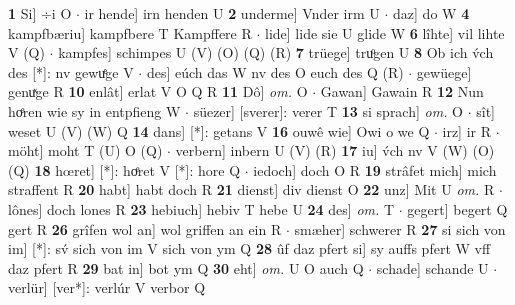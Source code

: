 \documentclass[8pt,a4paper,notitlepage]{article}
\begin{document}
\begin{table}[ht]
\begin{minipage}[t]{0.5\linewidth}
\textbf{1} Si] ÷i O  $\cdot$ ir hende] irn henden U \textbf{2} underme] Vnder irm U  $\cdot$ daz] do W \textbf{4} kampfbæriu] kampfbere T Kampffere R  $\cdot$ lide] lide sie U glide W \textbf{6} lîhte] vil lihte V (Q)  $\cdot$ kampfes] schimpes U (V) (O) (Q) (R) \textbf{7} trüege] truͦgen U \textbf{8} Ob ich v́ch des [*]: nv gewuͤge V  $\cdot$ des] eúch das W nv des O euch des Q (R)  $\cdot$ gewüege] genuͯge R \textbf{10} enlât] erlat V O Q R \textbf{11} Dô] \textit{om.} O  $\cdot$ Gawan] Gawain R \textbf{12} Nun hoͤren wie sy in entpfieng W  $\cdot$ süezer] [sverer]: verer T \textbf{13} si sprach] \textit{om.} O  $\cdot$ sît] weset U (V) (W) Q \textbf{14} dans] [*]: getans V \textbf{16} ouwê wie] Owi o we Q  $\cdot$ irz] ir R  $\cdot$ möht] moht T (U) O (Q)  $\cdot$ verbern] inbern U (V) (R) \textbf{17} iu] v́ch nv V (W) (O) (Q) \textbf{18} hœret] [*]: hoͤret V [*]: hore  Q  $\cdot$ iedoch] doch O R \textbf{19} strâfet mich] mich straffent R \textbf{20} habt] habt doch R \textbf{21} dienst] div dienst O \textbf{22} unz] Mit U \textit{om.} R  $\cdot$ lônes] doch lones R \textbf{23} hebiuch] hebiv T hebe U \textbf{24} des] \textit{om.} T  $\cdot$ gegert] begert Q gert R \textbf{26} grîfen wol an] wol griffen an ein R  $\cdot$ smæher] schwerer R \textbf{27} si sich von im] [*]: sv́ sich von im V sich von ym Q \textbf{28} ûf daz pfert si] sy auffs pfert W vff daz pfert R \textbf{29} bat in] bot ym Q \textbf{30} eht] \textit{om.} U O auch Q  $\cdot$ schade] schande U  $\cdot$ verlür] [ver*]: verlúr V verbor Q \newline
\end{minipage}
\end{table}
\end{document}
